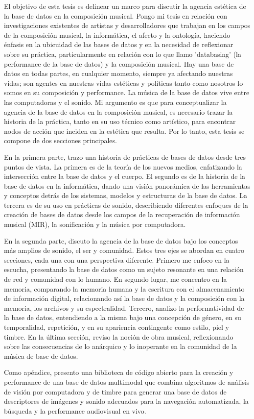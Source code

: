 El objetivo de esta tesis es delinear un marco para discutir la agencia estética de la base de datos en la composición musical. Pongo mi tesis en relación con investigaciones existentes de artistas y desarrolladores que trabajan en los campos de la composición musical, la informática, el afecto y la ontología, haciendo énfasis en la ubicuidad de las bases de datos y en la necesidad de reflexionar sobre su práctica, particularmente en relación con lo que llamo 'databasing' (la performance de la base de datos) y la composición musical. Hay una base de datos en todas partes, en cualquier momento, siempre ya afectando nuestras vidas; son agentes en nuestras vidas estéticas y políticas tanto como nosotros lo somos en su composición y performance. La música de la base de datos vive entre las computadoras y el sonido. Mi argumento es que para conceptualizar la agencia de la base de datos en la composición musical, es necesario trazar la historia de la práctica, tanto en su uso técnico como artístico, para encontrar nodos de acción que inciden en la estética que resulta. Por lo tanto, esta tesis se compone de dos secciones principales.
 
En la primera parte, trazo una historia de prácticas de bases de datos desde tres puntos de vista. La primera es de la teoría de los nuevos medios, enfatizando la intersección entre la base de datos y el cuerpo. El segundo es de la historia de la base de datos en la informática, dando una visión panorámica de las herramientas y conceptos detrás de los sistemas, modelos y estructuras de la base de datos. La tercera es de su uso en prácticas de sonido, describiendo diferentes enfoques de la creación de bases de datos desde los campos de la recuperación de información musical (MIR), la sonificación y la música por computadora.
 
En la segunda parte, discuto la agencia de la base de datos bajo los conceptos más amplios de sonido, el ser y comunidad. Estos tres ejes se abordan en cuatro secciones, cada una con una perspectiva diferente. Primero me enfoco en la escucha, presentando la base de datos como un sujeto resonante en una relación de red y comunidad con lo humano. En segundo lugar, me concentro en la memoria, comparando la memoria humana y la escritura con el almacenamiento de información digital, relacionando así la base de datos y la composición con la memoria, los archivos y su espectralidad. Tercero, analizo la performatividad de la base de datos, entendiendo a la misma bajo una concepción de género, en su temporalidad, repetición, y en su apariencia contingente como estilo, piel y timbre. En la última sección, reviso la noción de obra musical, reflexionando sobre las consecuencias de lo anárquico y lo inoperante en la comunidad de la música de base de datos.
 
Como apéndice, presento una biblioteca de código abierto para la creación y performance de una base de datos multimodal que combina algoritmos de análisis de visión por computadora y de timbre para generar una base de datos de descriptores de imágenes y sonido adecuados para la navegación automatizada, la búsqueda y la performance audiovisual en vivo.
